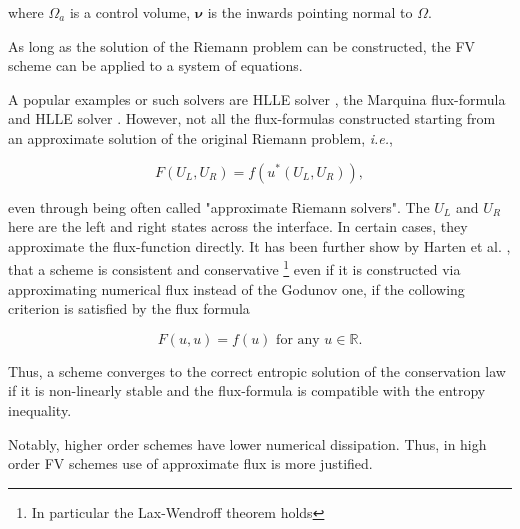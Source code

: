 where $\Omega_a$ is a control volume, $\boldsymbol{\nu}$ is the inwards pointing normal to $\Omega$.

As long as the solution of the Riemann problem can be constructed, the FV scheme can be applied to a system of equations. 

A popular examples or such solvers are HLLE solver \cite{Roe:1981}, the Marquina flux-formula \cite{Donat:1996} and HLLE solver \cite{Einfeldt:1988}. 
However, not all the flux-formulas constructed starting from an approximate solution of the original Riemann problem, \textit{i.e.},

\begin{equation}
F(U_L, U_R) = f(u^*(U_L, U_R)), 
\end{equation}

even through being often called "approximate Riemann solvers". 
The $U_L$ and $U_R$ here are the left and right states across the interface. 
In certain cases, they approximate the flux-function directly. 
It has been further show by Harten et al. \cite{Harten:1983}, that a scheme is consistent and conservative \footnote{In particular the Lax-Wendroff theorem holds} 
even if it is constructed via approximating numerical flux instead of the Godunov one, if the collowing criterion is satisfied by the flux formula

\begin{equation}
F(u, u) = f(u) \text{ for any } u\in \mathbb{R}.
\end{equation}

Thus, a scheme converges to the correct entropic solution of the conservation law if it is non-linearly stable and the flux-formula is compatible with the entropy inequality. 

Notably, higher order schemes have lower numerical dissipation. 
Thus, in high order FV schemes use of approximate flux is more justified.



